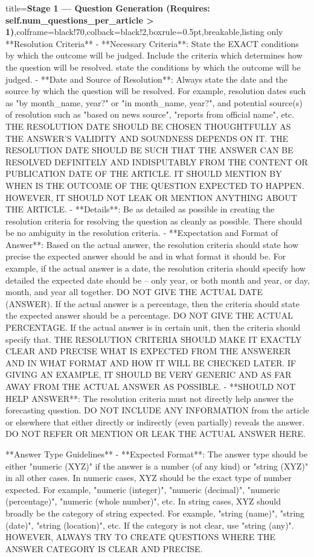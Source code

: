 \documentclass{article} %
\begin{document}
\begin{tcblisting}{title={\textbf{Stage 1 --- Question Generation (Requires:  self.num\_questions\_per\_article > 1)}},colframe=black!70,colback=black!2,boxrule=0.5pt,breakable,listing only}
**Resolution Criteria**
- **Necessary Criteria**: State the EXACT conditions by which the outcome will be judged. Include the criteria which determines how the question will be resolved. state the conditions by which the outcome will be judged. 
- **Date and Source of Resolution**: Always state the date and the source by which the question will be resolved. For example, resolution dates such as "by {{month_name}}, {{year}}?" or "in {{month_name}}, {{year}}?", and potential source(s) of resolution such as "based on {{news source}}", "reports from {{official name}}", etc. THE RESOLUTION DATE SHOULD BE CHOSEN THOUGHTFULLY AS THE ANSWER'S VALIDITY AND SOUNDNESS DEPENDS ON IT. THE RESOLUTION DATE SHOULD BE SUCH THAT THE ANSWER CAN BE RESOLVED DEFINITELY AND INDISPUTABLY FROM THE CONTENT OR PUBLICATION DATE OF THE ARTICLE. IT SHOULD MENTION BY WHEN IS THE OUTCOME OF THE QUESTION EXPECTED TO HAPPEN. HOWEVER, IT SHOULD NOT LEAK OR MENTION ANYTHING ABOUT THE ARTICLE. 
- **Details**: Be as detailed as possible in creating the resolution criteria for resolving the question as cleanly as possible. There should be no ambiguity in the resolution criteria.
- **Expectation and Format of Answer**: Based on the actual answer, the resolution criteria should state how precise the expected answer should be and in what format it should be. For example, if the actual answer is a date, the resolution criteria should specify how detailed the expected date should be -- only year, or both month and year, or day, month, and year all together. DO NOT GIVE THE ACTUAL DATE (ANSWER). If the actual answer is a percentage, then the criteria should state the expected answer should be a percentage. DO NOT GIVE THE ACTUAL PERCENTAGE.  If the actual answer is in certain unit, then the criteria should specify that. THE RESOLUTION CRITERIA SHOULD MAKE IT EXACTLY CLEAR AND PRECISE WHAT IS EXPECTED FROM THE ANSWERER AND IN WHAT FORMAT AND HOW IT WILL BE CHECKED LATER. IF GIVING AN EXAMPLE, IT SHOULD BE VERY GENERIC AND AS FAR AWAY FROM THE ACTUAL ANSWER AS POSSIBLE.
- **SHOULD NOT HELP ANSWER**: The resolution criteria must not directly help answer the forecasting question. DO NOT INCLUDE ANY INFORMATION from the article or elsewhere that either directly or indirectly (even partially) reveals the answer. DO NOT REFER OR MENTION OR LEAK THE ACTUAL ANSWER HERE.

**Answer Type Guidelines**
- **Expected Format**: The answer type should be either "numeric (XYZ)" if the answer is a number (of any kind) or "string (XYZ)" in all other cases. In numeric cases, XYZ should be the exact type of number expected. For example, "numeric (integer)", "numeric (decimal)", "numeric (percentage)", "numeric (whole number)", etc. In string cases, XYZ should broadly be the category of string expected. For example, "string (name)", "string (date)", "string (location)", etc. If the category is not clear, use "string (any)". HOWEVER, ALWAYS TRY TO CREATE QUESTIONS WHERE THE ANSWER CATEGORY IS CLEAR AND PRECISE.


\end{tcblisting}
\end{document}
